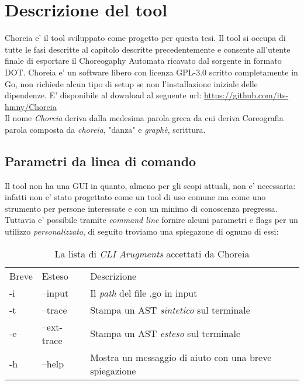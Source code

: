 \chapter{Descrizione del tool}
Choreia e' il tool sviluppato come progetto per questa tesi. Il tool si occupa di tutte le fasi descritte al capitolo descritte precedentemente e consente all'utente finale di esportare il Choreogaphy Automata ricavato dal sorgente in formato DOT.
Choreia e' un software libero con licenza GPL-3.0 scritto completamente in Go, non richiede alcun tipo di setup se non l'installazione iniziale delle dipendenze. E' disponibile al download al seguente url: \url{https://github.com/its-hmny/Choreia} \\
Il nome \emph{Choreia} deriva dalla medesima parola greca da cui deriva Coreografia parola composta da \emph{choreia}, "danza" e \emph{graphè}, scrittura.

\section{Parametri da linea di comando}
Il tool non ha una GUI in quanto, almeno per gli scopi attuali, non e' necessaria: infatti non e' stato progettato come un tool di uso comune ma come uno strumento per persone interessate e con un minimo di conoscenza pregressa.\\
Tuttavia e' possibile tramite \emph{command line} fornire alcuni parametri e flags per un utilizzo \emph{personalizzato}, di seguito troviamo una spiegazone di ognuno di essi:
\begin{table}[h!]
    \centering
    \begin{tabular}{l l l}
        Breve & Esteso      & Descrizione                                            \\
        -i    & --input     & Il \emph{path} del file .go in input                   \\
        -t    & --trace     & Stampa un AST \emph{sintetico} sul terminale           \\
        -e    & --ext-trace & Stampa un AST \emph{esteso} sul terminale              \\
        -h    & --help      & Mostra un messaggio di aiuto con una breve spiegazione \\
    \end{tabular}
    \caption{La lista di \emph{CLI Arugments} accettati da Choreia}
\end{table}

